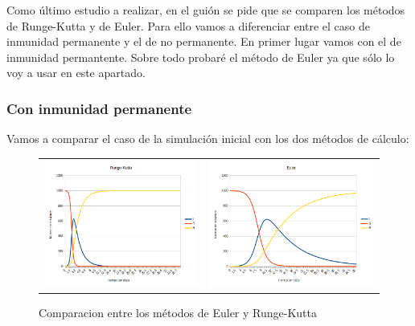\documentclass[11pt,a4paper]{report}
\begin{document}
Como último estudio a realizar, en el guión se pide que se comparen los métodos de Runge-Kutta y de Euler. Para ello vamos a diferenciar entre el caso de inmunidad permanente y el de no permanente. En primer lugar vamos con el de inmunidad permantente. Sobre todo probaré el método de Euler ya que sólo lo voy a usar en este apartado.

\subsubsection{Con inmunidad permanente}

Vamos a comparar el caso de la simulación inicial con los dos métodos de cálculo: 

\begin{figure}[H]
\begin{tabular}{ll}
\includegraphics[scale=0.25]{img/inmunidad/runge-kutta.png}
&
\includegraphics[scale=0.25]{img/inmunidad/euler.png}
\end{tabular}
\caption{Comparacion entre los métodos de Euler y Runge-Kutta}
\end{figure}
\end{document}

